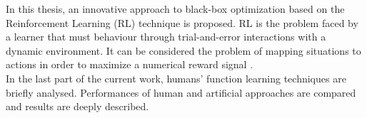 In this thesis, an innovative approach to black-box optimization based on the Reinforcement Learning (RL) technique is proposed. RL is the problem faced by a learner that must behaviour through trial-and-error interactions with a dynamic environment. It can be considered the problem of mapping situations to actions in order to maximize a numerical reward signal \cite{RLDef1}. \\

In the last part of the current work, humans' function learning techniques are briefly analysed. Performances of human and artificial approaches are compared and results are deeply described.